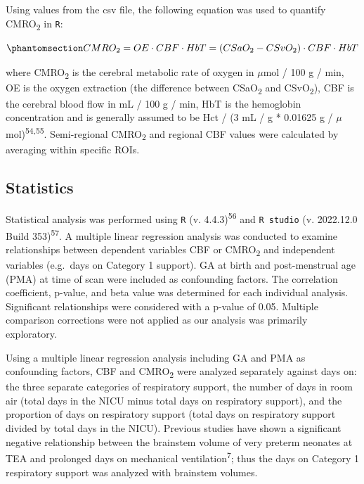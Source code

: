 \documentclass[
  letterpaper,
  DIV=11,
  numbers=noendperiod]{scrartcl}
\begin{document}
Using values from the csv file, the following equation was used to
quantify CMRO\textsubscript{2} in \texttt{R}:

\begin{equation}\phantomsection\label{eq-cmro2}{
CMRO_{2} = OE \cdot CBF \cdot HbT = \left(CSaO_{2} - CSvO_{2} \right) \cdot CBF \cdot HbT
}\end{equation}

where CMRO\textsubscript{2} is the cerebral metabolic rate of oxygen in
\(\mu\)mol / 100 g / min, OE is the oxygen extraction (the difference
between CSaO\textsubscript{2} and CSvO\textsubscript{2}), CBF is the
cerebral blood flow in mL / 100 g / min, HbT is the hemoglobin
concentration and is generally assumed to be Hct / (3 mL / g * 0.01625 g
/ \(\mu\)mol)\textsuperscript{54,55}. Semi-regional
CMRO\textsubscript{2} and regional CBF values were calculated by
averaging within specific ROIs.

\subsection{Statistics}\label{statistics}

Statistical analysis was performed using \texttt{R} (v.
4.4.3)\textsuperscript{56} and \texttt{R\ studio} (v. 2022.12.0 Build
353)\textsuperscript{57}. A multiple linear regression analysis was
conducted to examine relationships between dependent variables CBF or
CMRO\textsubscript{2} and independent variables (e.g.~days on Category 1
support). GA at birth and post-menstrual age (PMA) at time of scan were
included as confounding factors. The correlation coefficient, p-value,
and beta value was determined for each individual analysis. Significant
relationships were considered with a p-value of 0.05. Multiple
comparison corrections were not applied as our analysis was primarily
exploratory.

Using a multiple linear regression analysis including GA and PMA as
confounding factors, CBF and CMRO\textsubscript{2} were analyzed
separately against days on: the three separate categories of respiratory
support, the number of days in room air (total days in the NICU minus
total days on respiratory support), and the proportion of days on
respiratory support (total days on respiratory support divided by total
days in the NICU). Previous studies have shown a significant negative
relationship between the brainstem volume of very preterm neonates at
TEA and prolonged days on mechanical ventilation\textsuperscript{7};
thus the days on Category 1 respiratory support was analyzed with
brainstem volumes.
\end{document}

